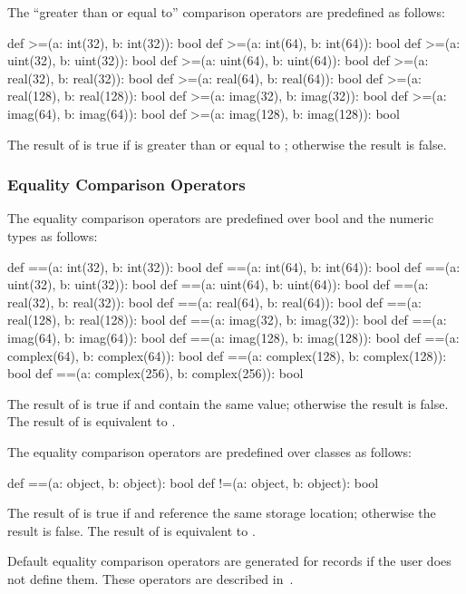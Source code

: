 The ``greater than or equal to'' comparison operators are predefined
as follows:
\begin{chapel}
def >=(a: int(32), b: int(32)): bool
def >=(a: int(64), b: int(64)): bool
def >=(a: uint(32), b: uint(32)): bool
def >=(a: uint(64), b: uint(64)): bool
def >=(a: real(32), b: real(32)): bool
def >=(a: real(64), b: real(64)): bool
def >=(a: real(128), b: real(128)): bool
def >=(a: imag(32), b: imag(32)): bool
def >=(a: imag(64), b: imag(64)): bool
def >=(a: imag(128), b: imag(128)): bool
\end{chapel}
The result of  is true if  is greater than or
equal to ; otherwise the result is false.

\subsubsection{Equality Comparison Operators}
\label{Equality_Comparison_Operators}

The equality comparison operators are predefined over bool and the
numeric types as follows:
\begin{chapel}
def ==(a: int(32), b: int(32)): bool
def ==(a: int(64), b: int(64)): bool
def ==(a: uint(32), b: uint(32)): bool
def ==(a: uint(64), b: uint(64)): bool
def ==(a: real(32), b: real(32)): bool
def ==(a: real(64), b: real(64)): bool
def ==(a: real(128), b: real(128)): bool
def ==(a: imag(32), b: imag(32)): bool
def ==(a: imag(64), b: imag(64)): bool
def ==(a: imag(128), b: imag(128)): bool
def ==(a: complex(64), b: complex(64)): bool
def ==(a: complex(128), b: complex(128)): bool
def ==(a: complex(256), b: complex(256)): bool
\end{chapel}
The result of  is true if  and  contain
the same value; otherwise the result is false.  The result of  is equivalent to .

The equality comparison operators are predefined over classes as
follows:
\begin{chapel}
def ==(a: object, b: object): bool
def !=(a: object, b: object): bool
\end{chapel}
The result of  is true if  and  reference
the same storage location; otherwise the result is false.  The result
of  is equivalent to .

Default equality comparison operators are generated for records if the
user does not define them.  These operators are described
in~.

